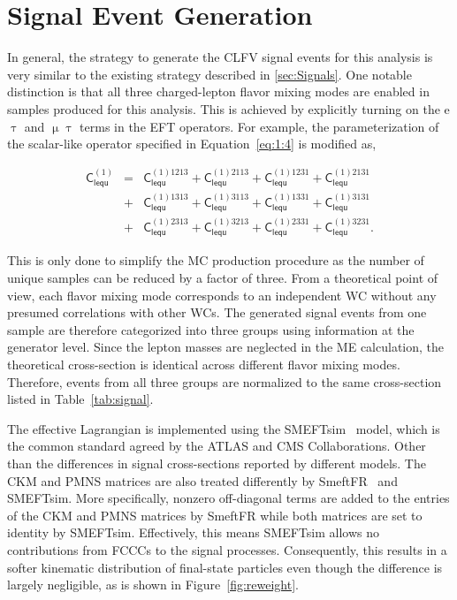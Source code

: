 \section{Signal Event Generation}
\label{sec:SigGen}

In general, the strategy to generate the \ac{CLFV} signal events for this analysis is very similar to the existing strategy described in \autoref{sec:Signals}. One notable distinction is that all three charged-lepton flavor mixing modes are enabled in samples produced for this analysis. This is achieved by explicitly turning on the e$\uptau$ and $\upmu\uptau$ terms in the \ac{EFT} operators. For example, the parameterization of the scalar-like operator specified in Equation~\ref{eq:1:4} is modified as,

\begin{eqnarray}
\textsf{C}_{\textsf{lequ}}^{(1)}  
 &=& \textsf{C}_{\textsf{lequ}}^{(1)1213}
 + \textsf{C}_{\textsf{lequ}}^{(1)2113}
 + \textsf{C}_{\textsf{lequ}}^{(1)1231}
 + \textsf{C}_{\textsf{lequ}}^{(1)2131} \nonumber\\
 &+& \textsf{C}_{\textsf{lequ}}^{(1)1313}
 + \textsf{C}_{\textsf{lequ}}^{(1)3113}
 + \textsf{C}_{\textsf{lequ}}^{(1)1331}
 + \textsf{C}_{\textsf{lequ}}^{(1)3131} \\
 &+& \textsf{C}_{\textsf{lequ}}^{(1)2313}
 + \textsf{C}_{\textsf{lequ}}^{(1)3213}
 + \textsf{C}_{\textsf{lequ}}^{(1)2331}
 + \textsf{C}_{\textsf{lequ}}^{(1)3231}. \nonumber
\label{eq:example}
\end{eqnarray}

This is only done to simplify the \ac{MC} production procedure as the number of unique samples can be reduced by a factor of three. From a theoretical point of view, each flavor mixing mode corresponds to an independent \ac{WC} without any presumed correlations with other \acp{WC}. The generated signal events from one sample are therefore categorized into three groups using information at the generator level. Since the lepton masses are neglected in the \ac{ME} calculation, the theoretical cross-section is identical across different flavor mixing modes. Therefore, events from all three groups are normalized to the same cross-section listed in Table~\ref{tab:signal}. 

The effective Lagrangian is implemented using the SMEFTsim~\cite{Brivio:2017btx} model, which is the common standard agreed by the \ac{ATLAS} and \ac{CMS} Collaborations. Other than the differences in signal cross-sections reported by different models. The \ac{CKM} and \ac{PMNS} matrices are also treated differently by SmeftFR~\cite{Dedes:2019uzs} and SMEFTsim. More specifically, nonzero off-diagonal terms are added to the entries of the \ac{CKM} and \ac{PMNS} matrices by SmeftFR while both matrices are set to identity by SMEFTsim. Effectively, this means SMEFTsim allows no contributions from \acp{FCCC} to the signal processes. Consequently, this results in a softer kinematic distribution of final-state particles even though the difference is largely negligible, as is shown in Figure~\ref{fig:reweight}.

